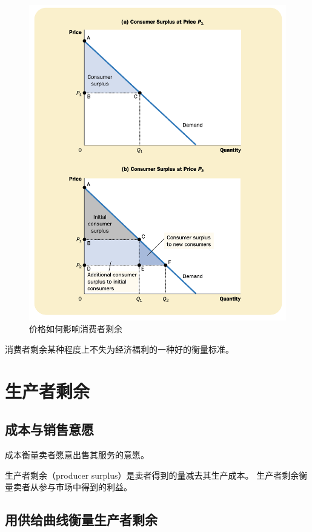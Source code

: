 \begin{figure}[H]
  \centering
  \includegraphics[width=\textwidth]{pics/consumer-surplus2}
  \caption{价格如何影响消费者剩余}
  \label{fig:consumer-surplus2}
\end{figure}


消费者剩余某种程度上不失为经济福利的一种好的衡量标准。

\section{生产者剩余}

\subsection{成本与销售意愿}

成本衡量卖者愿意出售其服务的意愿。

生产者剩余（producer surplus）是卖者得到的量减去其生产成本。
生产者剩余衡量卖者从参与市场中得到的利益。


\subsection{用供给曲线衡量生产者剩余}

